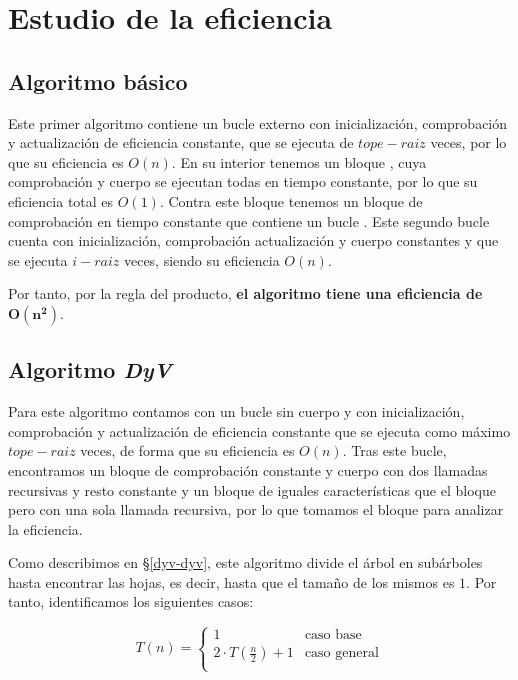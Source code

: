 \section{Estudio de la eficiencia}\label{dyv-eficiencia}

\subsection{Algoritmo básico}\label{dyv-eficiencia-basico}

Este primer algoritmo contiene un bucle  externo con inicialización, comprobación y actualización de eficiencia constante, que se ejecuta de $tope-raiz$ veces, por lo que su eficiencia es $O(n)$.
En su interior tenemos un bloque , cuya comprobación y cuerpo se ejecutan todas en tiempo constante, por lo que su eficiencia total es $O(1)$.
Contra este bloque  tenemos un bloque  de comprobación en tiempo constante que contiene un bucle .
Este segundo bucle cuenta con inicialización, comprobación actualización y cuerpo constantes y que se ejecuta $i-raiz$ veces, siendo su eficiencia $O(n)$.

Por tanto, por la regla del producto, \textbf{el algoritmo tiene una eficiencia de} $\boldsymbol{O(n^2)}$.

\subsection{Algoritmo \textit{DyV}}\label{dyv-eficiencia-dyv}

Para este algoritmo contamos con un bucle  sin cuerpo y con inicialización, comprobación y actualización de eficiencia constante que se ejecuta como máximo $tope-raiz$ veces, de forma que su eficiencia es $O(n)$.
Tras este bucle, encontramos un bloque  de comprobación constante y cuerpo con dos llamadas recursivas y resto constante y un bloque  de iguales características que el bloque  pero con una sola llamada recursiva, por lo que tomamos el bloque  para analizar la eficiencia.

Como describimos en \S\ref{dyv-dyv}, este algoritmo divide el árbol en subárboles hasta encontrar las hojas, es decir, hasta que el tamaño de los mismos es $1$.
Por tanto, identificamos los siguientes casos:

\[
T(n)=
\begin{cases}
	1                       & \text{caso base}    \\
	2\cdot T(\frac{n}{2})+1 & \text{caso general} \\
\end{cases}
\]

